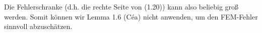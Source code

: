 \begin{solution}
\begin{enumerate}[label = \textbf{\alph*)}]
  Die Fehlerschranke (d.h. die rechte Seite von (1.20)) kann also beliebig groß werden.
  Somit können wir Lemma 1.6 (Céa) nicht anwenden, um den FEM-Fehler sinnvoll abzuschätzen.

\end{enumerate}

\end{solution}

